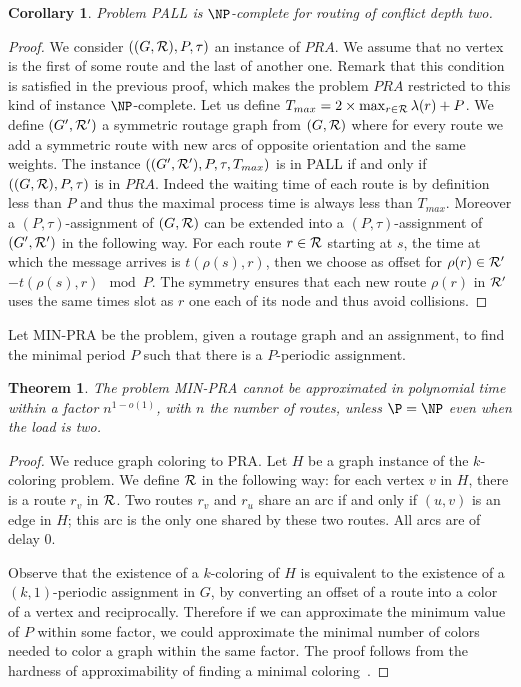 \documentclass[a4paper,10pt]{article}
\newtheorem{theorem}{Theorem}
\newtheorem{corollary}{Corollary}
\begin{document}
\begin{corollary}
Problem PALL is $\NP$-complete for routing of conflict depth two.
\end{corollary}
\begin{proof}
 We consider $((G,{\cal R}),P,\tau)$ an instance of $PRA$. We assume that no vertex is the first of some route and the last of another one. Remark that this condition is satisfied in the previous proof, which makes the problem $PRA$ restricted to this kind of instance $\NP$-complete. 
 Let us define $T_{max} = 2 \times \max_{r \in {\cal R}} \lambda(r) + P$. We define $(G',{\cal R}')$ a symmetric routage graph from $(G,{\cal R})$ where for every route we add a symmetric route with new arcs of opposite orientation and the same weights.
 The instance $((G',{\cal R'}),P,\tau,T_{max})$ is in PALL if and only if $((G,{\cal R}),P,\tau)$ is in $PRA$. Indeed the waiting time of each route is by definition less than $P$ and thus the maximal process time is always less than $T_{max}$. Moreover a $(P,\tau)$-assignment of $(G,{\cal R})$ can be extended into a $(P,\tau)$-assignment of $(G',{\cal R'})$ in the following way. For each route $r \in \cal{R}$ starting at $s$, the time at which the message arrives is $t(\rho(s),r)$, then we choose as offset for $\rho(r) \in \cal{R}'$ $-t(\rho(s),r) \mod P$. The symmetry ensures that each new route $\rho(r)$ in ${\cal R'}$ uses the same times slot as $r$ one each of its node and thus avoid collisions.
\end{proof}

Let MIN-PRA be the problem, given a routage graph and an assignment, to find the minimal period $P$ such that there is a $P$-periodic assignment. 

\begin{theorem}\label{th:inapprox}
 The problem MIN-PRA cannot be approximated in polynomial time within a factor $n^{1-o(1)}$, with $n$ the number of routes, unless $\P = \NP$ even when the load is two.
\end{theorem}

\begin{proof}
 We reduce graph coloring to PRA. Let $H$ be a graph instance of the $k$-coloring problem. 
 We define ${\cal R}$ in the following way: for each vertex $v$ in $H$, there is a route $r_v$ in ${\cal R}$.
 Two routes $r_v$ and $r_u$ share an arc if and only if $(u,v)$ is an edge in $H$; this arc is the only one shared by these two routes. All arcs are of delay $0$. 
 
 Observe that the existence of a $k$-coloring of $H$ is equivalent to the existence of a $(k,1)$-periodic assignment in $G$, 
 by converting an offset of a route into a color of a vertex and reciprocally. Therefore if we can approximate the minimum value of $P$ within some factor, we could approximate the minimal number of colors needed to color a graph within the same factor. The proof follows from the hardness of approximability of finding a minimal coloring~\cite{zuckerman2006linear}.
\end{proof}
\end{document}
